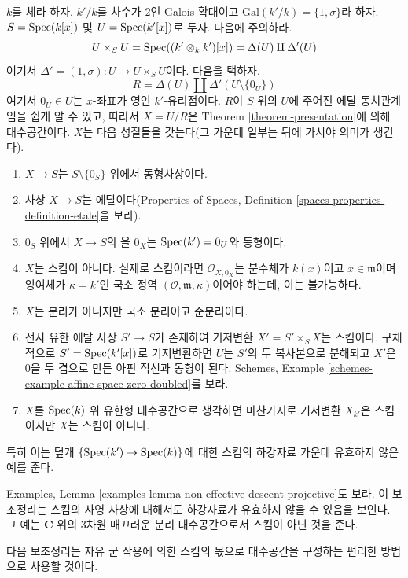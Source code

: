 \begin{example}
\label{example-non-representable-descent}
$k$를 체라 하자. $k'/k$를 차수가 $2$인 Galois 확대이고
$\text{Gal}(k'/k) = \{1, \sigma\}$라 하자. $S = \mathop{\mathrm{Spec}}(k[x])$ 및
$U = \mathop{\mathrm{Spec}}(k'[x])$로 두자. 다음에 주의하라.
$$
U \times_S U =
\mathop{\mathrm{Spec}}((k' \otimes_k k')[x]) =
\Delta(U) \amalg \Delta'(U)
$$
여기서 $\Delta' = (1, \sigma) : U \to U \times_S U$이다. 다음을 택하자.
$$
R = \Delta(U) \amalg \Delta'(U \setminus \{0_U\})
$$
여기서 $0_U \in U$는 $x$-좌표가 영인 $k'$-유리점이다.
$R$이 $S$ 위의 $U$에 주어진 에탈 동치관계임을 쉽게 알 수 있고,
따라서 $X = U/R$은 Theorem \ref{theorem-presentation}에 의해
대수공간이다. $X$는 다음 성질들을 갖는다(그 가운데 일부는 뒤에 가서야
의미가 생긴다).
\begin{enumerate}
\item $X \to S$는 $S \setminus \{0_S\}$ 위에서 동형사상이다.
\item 사상 $X \to S$는 에탈이다(Properties of Spaces, Definition
\ref{spaces-properties-definition-etale}을 보라).
\item $0_S$ 위에서 $X \to S$의 올 $0_X$는
$\mathop{\mathrm{Spec}}(k') = 0_U$와 동형이다.
\item $X$는 스킴이 아니다. 실제로 스킴이라면
$\mathcal{O}_{X, 0_X}$는 분수체가 $k(x)$이고
$x \in \mathfrak m$이며 잉여체가 $\kappa = k'$인 국소 정역
$(\mathcal{O}, \mathfrak m, \kappa)$이어야 하는데, 이는 불가능하다.
\item $X$는 분리가 아니지만 국소 분리이고 준분리이다.
\item 전사 유한 에탈 사상 $S' \to S$가 존재하여 기저변환
$X' = S' \times_S X$는 스킴이다. 구체적으로
$S' = \mathop{\mathrm{Spec}}(k'[x])$로 기저변환하면 $U$는 $S'$의 두 복사본으로
분해되고 $X'$은 $0$을 두 겹으로 만든 아핀 직선과 동형이 된다.
Schemes, Example \ref{schemes-example-affine-space-zero-doubled}를 보라.
\item $X$를 $\mathop{\mathrm{Spec}}(k)$ 위 유한형 대수공간으로 생각하면 마찬가지로
기저변환 $X_{k'}$은 스킴이지만 $X$는 스킴이 아니다.
\end{enumerate}
특히 이는 덮개 $\{\mathop{\mathrm{Spec}}(k') \to \mathop{\mathrm{Spec}}(k)\}$에 대한 스킴의
하강자료 가운데 유효하지 않은 예를 준다.
\end{example}

\noindent
Examples, Lemma \ref{examples-lemma-non-effective-descent-projective}도
보라. 이 보조정리는 스킴의 사영 사상에 대해서도 하강자료가 유효하지
않을 수 있음을 보인다. 그 예는 ${\mathbf C}$ 위의 3차원 매끄러운
분리 대수공간으로서 스킴이 아닌 것을 준다.

\medskip\noindent
다음 보조정리는 자유 군 작용에 의한 스킴의 몫으로 대수공간을 구성하는
편리한 방법으로 사용할 것이다.

